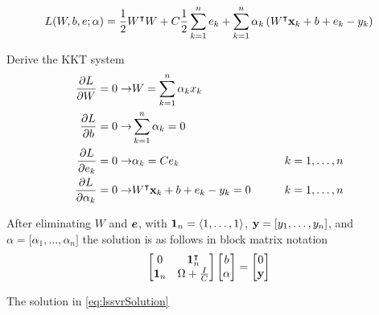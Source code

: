 \begin{equation}
        L(W,b,e;\vb{\alpha}) = \frac{1}{2}W^{\intercal}W + C\frac{1}{2}\sum_{k=1}^{n}e_{k} + \sum_{k=1}^{n}\alpha_{k} \left(W^{\intercal}\vb{x}_{k}+b+e_{k} - y_{k} \right)
\end{equation}

Derive the KKT system
\begin{equation}
        \begin{split}
                \pdv{L}{W} = 0 \rightarrow & W = \sum_{k=1}^{n}\alpha_{k}x_{k} \\
                \pdv{L}{b} = 0 \rightarrow & \sum_{k=1}^{n}\alpha_{k} = 0 \\
                \pdv{L}{e_{k}} = 0 \rightarrow & \alpha_{k} = C e_{k} & \qquad k=1,\dots,n\\
                \pdv{L}{\alpha_{k}} = 0 \rightarrow & W^{\intercal}\vb{x}_{k}+b+e_{k} - y_{k} = 0 & \qquad k=1,\dots,n\\
        \end{split}
\end{equation}

After eliminating $W$ and $\vb*{e}$, with $\vb{1}_{n} = \langle 1,\dots,1\rangle$, $\vb{y} = \lbrack y_1, \dots, y_n \rbrack $, and ${\alpha} = \lbrack \alpha_1, \dots, \alpha_n \rbrack $ the solution is as follows in block matrix notation
\begin{equation} \label{eq:lssvrSolution}
        \begin{bmatrix}
                0          & \vb{1}_{n}^{\intercal} \\
                \vb{1}_{n} & \Omega + \frac{I}{C}
        \end{bmatrix}
        \begin{bmatrix}
                b           \\
                \vb{\alpha} \\
        \end{bmatrix}
        =
        \begin{bmatrix}
                0      \\
                \vb{y} \\
        \end{bmatrix}
\end{equation}

The solution in \cref{eq:lssvrSolution}

